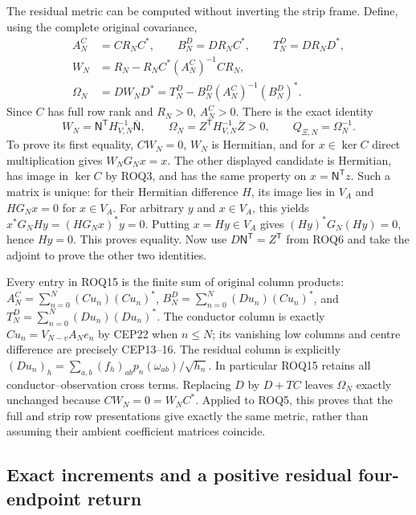 \documentclass[11pt,a4paper]{article}
\begin{document}
The residual metric can be computed without inverting the strip frame.
Define, using the complete original covariance,
\[
 \begin{split}
 A_N^C&=CR_NC^*,\qquad B_N^D=DR_NC^*,\qquad T_N^D=DR_ND^*,\\
 W_N&=R_N-R_NC^*(A_N^C)^{-1}CR_N,\\
 \Omega_N&=DW_ND^*
          =T_N^D-B_N^D(A_N^C)^{-1}(B_N^D)^*.
 \end{split}\tag{ROQ15}
\]
Since $C$ has full row rank and $R_N>0$, $A_N^C>0$. There is the exact
identity
\[
 W_N=\mathsf N^{\mathsf T}H_{V,N}^{-1}\overline{\mathsf N},
 \qquad \Omega_N=Z^{\mathsf T}H_{V,N}^{-1}\overline Z>0,
 \qquad Q_{\Xi,N}=\Omega_N^{-1}.
 \tag{ROQ16}
\]
To prove its first equality, $CW_N=0$, $W_N$ is Hermitian, and for
$x\in\ker C$ direct multiplication gives $W_NG_Nx=x$.
The other displayed candidate is Hermitian, has image in $\ker C$
by ROQ3, and has the same property on $x=\mathsf N^{\mathsf T}z$.
Such a matrix is unique: for their Hermitian difference $H$, its image
lies in $V_A$ and $HG_Nx=0$ for $x\in V_A$. For arbitrary $y$ and
$x\in V_A$, this yields $x^*G_NHy=(HG_Nx)^*y=0$.
Putting $x=Hy\in V_A$ gives $(Hy)^*G_N(Hy)=0$, hence $Hy=0$.
This proves equality. Now use $D\mathsf N^{\mathsf T}=Z^{\mathsf T}$
from ROQ6 and take the adjoint to prove the other two identities.

Every entry in ROQ15 is the finite sum of original column products:
$A_N^C=\sum_{n=0}^N(Cu_n)(Cu_n)^*$,
$B_N^D=\sum_{n=0}^N(Du_n)(Cu_n)^*$, and
$T_N^D=\sum_{n=0}^N(Du_n)(Du_n)^*$.
The conductor column is exactly
$Cu_n=V_{N-v}A_Ne_n$ by CEP22 when $n\le N$; its vanishing low
columns and centre difference are precisely CEP13--16.
The residual column is explicitly
$(Du_n)_h=\sum_{a,b}(f_h)_{ab}p_n(\omega_{ab})/\sqrt{h_n}$.
In particular ROQ15 retains all conductor--observation cross terms.
Replacing $D$ by $D+TC$ leaves $\Omega_N$ exactly unchanged because
$CW_N=0=W_NC^*$. Applied to ROQ5, this proves that the full and
strip row presentations give exactly the same metric, rather than
assuming their ambient coefficient matrices coincide.

\subsection{Exact increments and a positive residual four-endpoint return}
\end{document}
